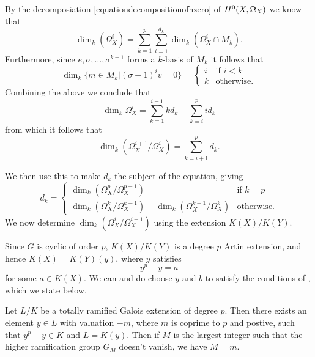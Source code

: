 By the decomposiation \eqref{equationdecompositionofhzero} of ${H^0(X,\Omega_X)}$ we know that
    \[
    \dim_k \left( \Omega_X^i\right) = \sum_{k=1}^p \sum_{i=1}^{d_k} \dim_k \left( \Omega_X^i \cap M_k \right).
    \]
Furthermore, since $e, \sigma, \ldots, \sigma^{k-1}$ forms a $k$-basis of $M_k$ it follows that 
    \[
    \dim_k\{ m \in M_k |(\sigma - 1)^iv = 0 \} = 
        \begin{cases}
        i & \text{if } i < k \\
        k & \text{otherwise.}
        \end{cases}
     \]   
Combining the above we conclude that 
    \[
    \dim_k \Omega_X^i = \sum_{k=1}^{i-1} kd_k + \sum_{k=i}^p id_k
    \]
from which it follows that
    \[
    \dim_k \left( \Omega_X^{i+1}/\Omega_X^i \right) = \sum_{k=i+1}^p d_k.
    \]


We then use this to make $d_k$ the subject of the equation, giving
    \[
    d_k = 
        \begin{cases}
        \dim_k \left( \Omega_X^p/\Omega_X^{p-1} \right) & \text{if } k = p \\
        \dim_k \left( \Omega_X^k/\Omega_X^{k-1} \right) - \dim_k \left( \Omega_X^{k+1}/\Omega_X^k \right) & \text{otherwise.}
        \end{cases}
    \]
We now determine $\dim_k\left( \Omega_X^i/\Omega_X^{i-1} \right)$ using the extension $K(X)/K(Y)$.

Since $G$ is cyclic of order $p$, $K(X)/K(Y)$ is a degree $p$ Artin extension, and hence $K(X) = K(Y)(y)$, where $y$ satisfies
    \[
    y^p - y = a
    \]
for some $a \in K(X)$.
We can and do choose $y$ and $b$ to satisfy the conditions of \cite[App.\ 5, Lem.\ 5.1]{quaddiffequi}, which we state below.

    \begin{lem}
    Let $L/K$ be a totally ramified Galois extension of degree $p$.
    Then there exists an element $y \in L$ with valuation $-m$, where $m$ is coprime to $p$ and postive, such that $y^p - y \in K$ and $L = K(y)$.
    Then if $M$ is the largest integer such that the higher ramification group $G_M$ doesn't vanish, we have $M = m$.
    \end{lem}





































